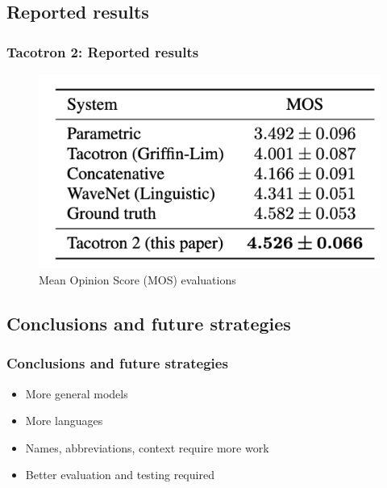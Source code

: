 \documentclass{beamer}
\begin{document}
  \subsection{Reported results}
  \begin{frame}
    \frametitle{Tacotron 2: Reported results}
    \begin{figure}
      \includegraphics[scale=0.3]{images/tacotron_results.png}
      \caption{Mean Opinion Score (MOS) evaluations}
    \end{figure}
  \end{frame}

  \subsection{Conclusions and future strategies}
  \begin{frame}
    \frametitle{Conclusions and future strategies}
    \begin{itemize}
      \item More general models
      \item More languages
      \item Names, abbreviations, context require more work
      \item Better evaluation and testing required
    \end{itemize}
  \end{frame}
  
\end{document}

